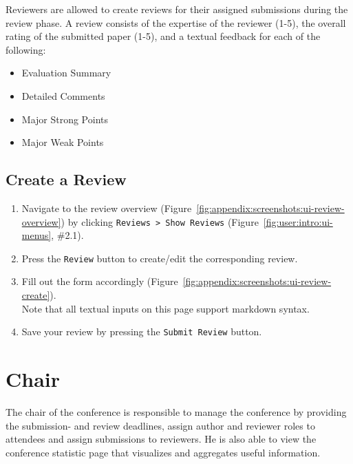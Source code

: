 \documentclass[nochapterpage,nopartpage,noheadingspace,numbersubsubsec,bigchapter,colorback,accentcolor=tud9c,10pt]{tudreport}
\begin{document}
    Reviewers are allowed to create reviews for their assigned submissions during the review phase. A review consists of the expertise of the reviewer (1-5), the overall rating of the submitted paper (1-5), and a textual feedback for each of the following:
        \begin{multicols}{2}
        \begin{itemize}
            \item Evaluation Summary
            \item Detailed Comments
            \item Major Strong Points
            \item Major Weak Points
        \end{itemize}
        \end{multicols}

  \section{Create a Review}
  \label{ch:user:reviewer:create-review}

        \begin{enumerate}
            \setlength\itemsep{0em}
            \item Navigate to the review overview (Figure~\ref{fig:appendix:screenshots:ui-review-overview}) by clicking \texttt{Reviews > Show Reviews} (Figure~\ref{fig:user:intro:ui-menus}, \#2.1).
            \item Press the \texttt{Review} button to create/edit the corresponding review.
            \item Fill out the form accordingly (Figure~\ref{fig:appendix:screenshots:ui-review-create}).\\
            Note that all textual inputs on this page support markdown syntax.
            \item Save your review by pressing the \texttt{Submit Review} button.
        \end{enumerate}

  \chapter{Chair}
  \label{ch:user:chair}

    The chair of the conference is responsible to manage the conference by providing the submission- and review deadlines, assign author and reviewer roles to attendees and assign submissions to reviewers. He is also able to view the conference statistic page that visualizes and aggregates useful information.
\end{document}
